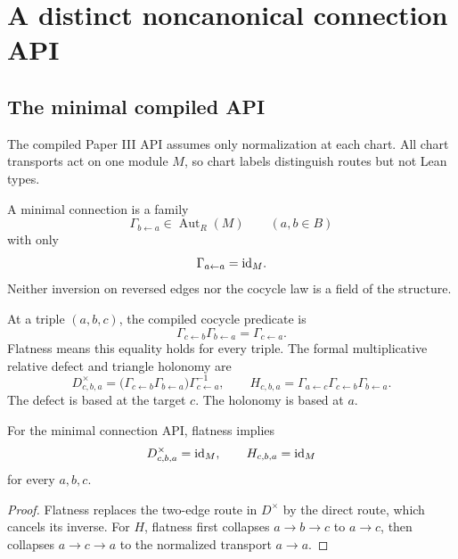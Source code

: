 \section{A distinct noncanonical connection API}
\label{sec:connection}

\subsection{The minimal compiled API}

The compiled Paper III API assumes only normalization at each chart.  All
chart transports act on one module $M$, so chart labels distinguish routes
but not Lean types.

\begin{definition}
\label{def:minimal-connection}
A minimal connection is a family
\[
\Gamma_{b\leftarrow a}\in\operatorname{Aut}_R(M)
\qquad(a,b\in B)
\]
with only
\[
\Gamma_{a\leftarrow a}=\mathrm{id}_M.
\]
Neither inversion on reversed edges nor the cocycle law is a field of the
structure.
\end{definition}

At a triple $(a,b,c)$, the compiled cocycle predicate is
\[
\Gamma_{c\leftarrow b}\Gamma_{b\leftarrow a}
=\Gamma_{c\leftarrow a}.
\]
Flatness means this equality holds for every triple.  The formal
multiplicative relative defect and triangle holonomy are
\[
D^\times_{c,b,a}
=
\bigl(\Gamma_{c\leftarrow b}\Gamma_{b\leftarrow a}\bigr)
\Gamma_{c\leftarrow a}^{-1},
\qquad
H_{c,b,a}
=
\Gamma_{a\leftarrow c}
\Gamma_{c\leftarrow b}
\Gamma_{b\leftarrow a}.
\]
The defect is based at the target $c$.  The holonomy is based at $a$.

\begin{theorem}
\label{thm:minimal-flatness}
For the minimal connection API, flatness implies
\[
D^\times_{c,b,a}=\mathrm{id}_M,
\qquad
H_{c,b,a}=\mathrm{id}_M
\]
for every $a,b,c$.
\end{theorem}

\begin{proof}
Flatness replaces the two-edge route in $D^\times$ by the direct route,
which cancels its inverse.  For $H$, flatness first collapses $a\to b\to c$
to $a\to c$, then collapses $a\to c\to a$ to the normalized transport
$a\to a$.
\end{proof}

